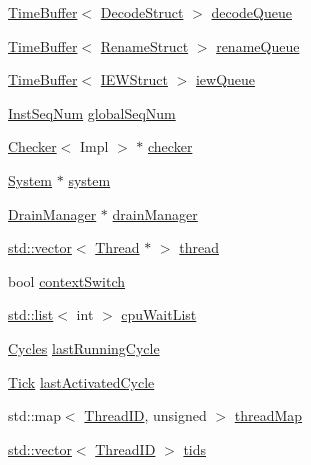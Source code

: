 \begin{DoxyCompactItemize}
\item 
\hyperlink{classTimeBuffer}{TimeBuffer}$<$ \hyperlink{classFullO3CPU_ae7f8b193f518ed524a498ef7ab564902}{DecodeStruct} $>$ \hyperlink{classFullO3CPU_a8c674fbc9b0625a2231b669aceb0dd73}{decodeQueue}
\item 
\hyperlink{classTimeBuffer}{TimeBuffer}$<$ \hyperlink{classFullO3CPU_a494521ebae1f8b01fe0ed16320494e6a}{RenameStruct} $>$ \hyperlink{classFullO3CPU_ae590391fe7915c744cde571b7d15d893}{renameQueue}
\item 
\hyperlink{classTimeBuffer}{TimeBuffer}$<$ \hyperlink{classFullO3CPU_a8ca44c33753253e21ca215123e8b5005}{IEWStruct} $>$ \hyperlink{classFullO3CPU_a9429710408b27da398dc15a2eb80b9fc}{iewQueue}
\item 
\hyperlink{inst__seq_8hh_a258d93d98edaedee089435c19ea2ea2e}{InstSeqNum} \hyperlink{classFullO3CPU_a5f72a799d8b189b4fccda3cde457145e}{globalSeqNum}
\item 
\hyperlink{classChecker}{Checker}$<$ Impl $>$ $\ast$ \hyperlink{classFullO3CPU_a85ab02c76c80bbfce7b3ce7981c55f68}{checker}
\item 
\hyperlink{classSystem}{System} $\ast$ \hyperlink{classFullO3CPU_af27ccd765f13a4b7bd119dc7579e2746}{system}
\item 
\hyperlink{classDrainManager}{DrainManager} $\ast$ \hyperlink{classFullO3CPU_a329b71fb934a93312ca0aacbf5a3f982}{drainManager}
\item 
\hyperlink{classstd_1_1vector}{std::vector}$<$ \hyperlink{structO3ThreadState}{Thread} $\ast$ $>$ \hyperlink{classFullO3CPU_afe9da004c5a3f37cbb72fa3763d4c0d1}{thread}
\item 
bool \hyperlink{classFullO3CPU_a4fd841dc8d29605dc13a120cc5a9b438}{contextSwitch}
\item 
\hyperlink{classstd_1_1list}{std::list}$<$ int $>$ \hyperlink{classFullO3CPU_a11435331f730084ec731d6f88c255290}{cpuWaitList}
\item 
\hyperlink{classCycles}{Cycles} \hyperlink{classFullO3CPU_a88989147c1b0b4ccba38fa941722ce5d}{lastRunningCycle}
\item 
\hyperlink{base_2types_8hh_a5c8ed81b7d238c9083e1037ba6d61643}{Tick} \hyperlink{classFullO3CPU_af81ed3d351dcefbd5ca122147676af22}{lastActivatedCycle}
\item 
std::map$<$ \hyperlink{base_2types_8hh_ab39b1a4f9dad884694c7a74ed69e6a6b}{ThreadID}, unsigned $>$ \hyperlink{classFullO3CPU_a08db914bbe37a5fa8c008248fa9647f6}{threadMap}
\item 
\hyperlink{classstd_1_1vector}{std::vector}$<$ \hyperlink{base_2types_8hh_ab39b1a4f9dad884694c7a74ed69e6a6b}{ThreadID} $>$ \hyperlink{classFullO3CPU_a457642e81692e24e601ec32c778042a2}{tids}

\end{DoxyCompactItemize}
